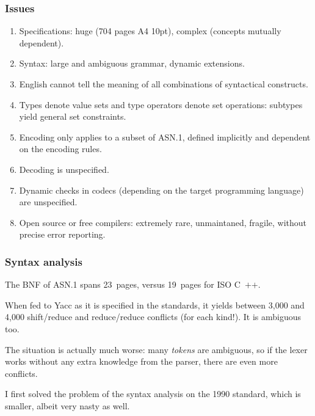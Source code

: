 \documentclass[compress,dvips,xcolor={dvipsnames},t]{beamer}
\newcommand\ASN{\textsf{ASN.1}\xspace}
\newcommand\Cpp{\mbox{\textsf{C} \hspace*{-2.5mm} \raise 0.7mm \hbox 
{${\scriptscriptstyle \textsf{++}}$}}\xspace}
\begin{document}
\begin{frame}
\frametitle{Issues}

\begin{enumerate}

  \item Specifications: huge (704 pages A4 10pt), complex (concepts
  mutually dependent).

  \item Syntax: large and ambiguous grammar, dynamic extensions.

  \item English cannot tell the meaning of all combinations of
    syntactical constructs.
  
  \item Types denote value sets and type operators denote set
    operations: subtypes yield general set constraints.

  \item Encoding only applies to a subset of \ASN, defined
    implicitly and dependent on the encoding rules.

  \item Decoding is unspecified.

  \item Dynamic checks in codecs (depending on the target programming
    language) are unspecified.

  \item Open source or free compilers: extremely rare, unmaintaned,
    fragile, without precise error reporting.

\end{enumerate}

\end{frame}


\begin{frame}
\frametitle{Syntax analysis}

The BNF of \ASN spans 23~pages, versus 19~pages for ISO \Cpp.

\bigskip

When fed to Yacc as it is specified in the standards, it yields
between 3,000 and 4,000 shift/reduce and reduce/reduce conflicts
(for each kind!). It is ambiguous too.

\bigskip

The situation is actually much worse: many \emph{tokens} are
ambiguous, so if the lexer works without any extra knowledge from the
parser, there are even more conflicts.

\bigskip

I first solved the problem of the syntax analysis on the 1990
standard, which is smaller, albeit very nasty as well.

\end{frame}
\end{document}

